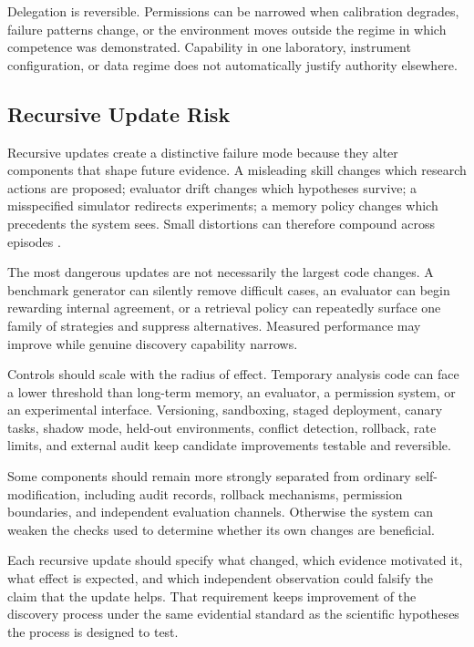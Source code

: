 \documentclass[11pt, a4paper, copyright]{google}
\begin{document}
Delegation is reversible. Permissions can be narrowed when calibration degrades, failure patterns change, or the environment moves outside the regime in which competence was demonstrated. Capability in one laboratory, instrument configuration, or data regime does not automatically justify authority elsewhere.

\subsection{Recursive Update Risk}
\label{subsec:recursive-improvement-risks}

Recursive updates create a distinctive failure mode because they alter components that shape future evidence. A misleading skill changes which research actions are proposed; evaluator drift changes which hypotheses survive; a misspecified simulator redirects experiments; a memory policy changes which precedents the system sees. Small distortions can therefore compound across episodes \citep{yin2025godelagent,zhang2025darwingodel,tang2025risks}.

The most dangerous updates are not necessarily the largest code changes. A benchmark generator can silently remove difficult cases, an evaluator can begin rewarding internal agreement, or a retrieval policy can repeatedly surface one family of strategies and suppress alternatives. Measured performance may improve while genuine discovery capability narrows.

Controls should scale with the radius of effect. Temporary analysis code can face a lower threshold than long-term memory, an evaluator, a permission system, or an experimental interface. Versioning, sandboxing, staged deployment, canary tasks, shadow mode, held-out environments, conflict detection, rollback, rate limits, and external audit keep candidate improvements testable and reversible.

Some components should remain more strongly separated from ordinary self-modification, including audit records, rollback mechanisms, permission boundaries, and independent evaluation channels. Otherwise the system can weaken the checks used to determine whether its own changes are beneficial.

Each recursive update should specify what changed, which evidence motivated it, what effect is expected, and which independent observation could falsify the claim that the update helps. That requirement keeps improvement of the discovery process under the same evidential standard as the scientific hypotheses the process is designed to test.
\end{document}
